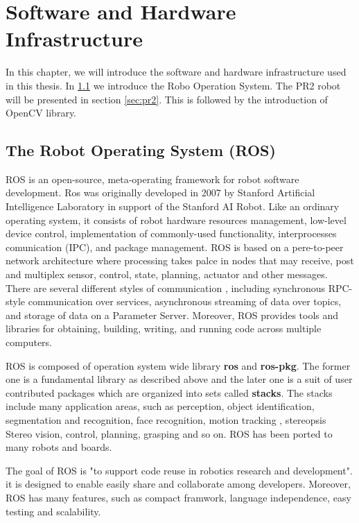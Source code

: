 \chapter{Software and Hardware Infrastructure}
\label{chapter:SHI}
In this chapter, we will introduce the software and hardware
infrastructure used in this thesis. In \ref{sec:ros} we introduce the
Robo Operation System. The PR2 robot will be presented in section
\ref{sec:pr2}. This is followed by the introduction of OpenCV library.

\section{The Robot Operating System (ROS)}
\label{sec:ros}
ROS is an open-source, meta-operating framework for robot software
development. Ros was originally developed in 2007 by Stanford Artificial Intelligence Laboratory in support of the Stanford AI Robot\cite{quigley2007stair}. Like an ordinary operating system, it consists of  robot
hardware resources management, low-level device control, implementation
of commonly-used functionality, interprocesses comunication (IPC), and package
management. ROS is based on a pere-to-peer network architecture where
processing takes palce in nodes that may receive, post and 
multiplex sensor, control, state, planning, actuator and other
messages. There are several different styles of communication
, including synchronous RPC-style communication over services, asynchronous
streaming of data over topics, and storage of data on a Parameter
Server.
Moreover, ROS provides tools and libraries for obtaining, building, writing, and
running code across multiple computers.

ROS is composed of operation system wide library \textbf{ros} and
\textbf{ros-pkg}. The former one is a fundamental library as described
above and the later one is a suit of user contributed packages which
are organized into sets called \textbf{stacks}. The stacks include
many application areas, such as  perception, object identification,
segmentation and recognition, face recognition, motion tracking ,
stereopsis Stereo vision, control, planning, grasping and so on. ROS has been ported to many robots and boards.

The goal of ROS is "to support code reuse in robotics research and
development"\cite{rosintroduction}.  it is designed to enable easily
share and collaborate among developers. Moreover, ROS has many
features, such as compact framwork, language independence, easy
testing and scalability.

